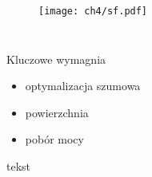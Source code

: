 \begin{columns}

    \begin{figure}[H]
        \texttt{[image: ch4/sf.pdf]}
    \end{figure}


\end{columns}

\begin{block}{Kluczowe wymagnia}
    \begin{itemize}
        \item optymalizacja szumowa
        \item powierzchnia
        \item pobór mocy
    \end{itemize}
     \end{block}


 {\renewcommand\normalsize{\small}%
\normalsize
tekst
}